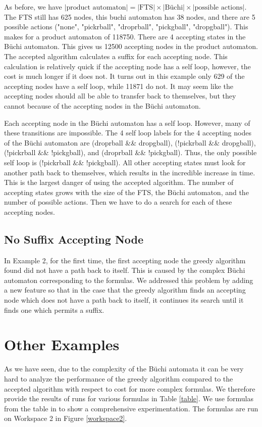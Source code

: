 As before, we have $|\text{product automaton}| =|\text{FTS}| \times |\text{B\"uchi}| \times |\text{possible actions}|$. The FTS still has 625 nodes, this buchi automaton has 38 nodes, and there are 5 possible actions ("none", "pickrball", "droprball", "pickgball", "dropgball"). This makes for a product automaton of 118750. There are 4 accepting states in the B\"uchi automaton. This gives us 12500 accepting nodes in the product automaton. The accepted algorithm calculates a suffix for each accepting node. This calculation is relatively quick if the accepting node has a self loop, however, the cost is much longer if it does not. It turns out in this example only 629 of the accepting nodes have a self loop, while 11871 do not. It may seem like the accepting nodes should all be able to transfer back to themselves, but they cannot because of the accepting nodes in the B\"uchi automaton. 

Each accepting node in the B\"uchi automaton has a self loop. However, many of these transitions are impossible. The 4 self loop labels for the 4 accepting nodes of the B\"uchi automaton are (droprball \&\& dropgball), (!pickrball \&\& dropgball), (!pickrball \&\& !pickgball), and (droprball \&\& !pickgball). Thus, the only possible self loop is (!pickrball \&\& !pickgball). All other accepting states must look for another path back to themselves, which results in the incredible increase in time. This is the largest danger of using the accepted algorithm. The number of accepting states grows with the size of the FTS, the B\"uchi automaton, and the number of possible actions. Then we have to do a search for each of these accepting nodes.  

\subsection{No Suffix Accepting Node}
In Example 2, for the first time, the first accepting node the greedy algorithm found did not have a path back to itself. This is caused by the complex B\"uchi automaton corresponding to the formulas. We addressed this problem by adding a new feature so that in the case that the greedy algorithm finds an accepting node which does not have a path back to itself, it continues its search until it finds one which permits a suffix. 

\section{Other Examples}
As we have seen, due to the complexity of the B\"uchi automata it can be very hard to analyze the performance of the greedy algorithm compared to the accepted algorithm with respect to cost for more complex formulas. We therefore provide the results of runs for various formulas in Table \ref{table}. We use formulas from the table in \cite{somenzi00} to show a comprehensive experimentation. The formulas are run on Workspace 2 in Figure \ref{workspace2}. 

